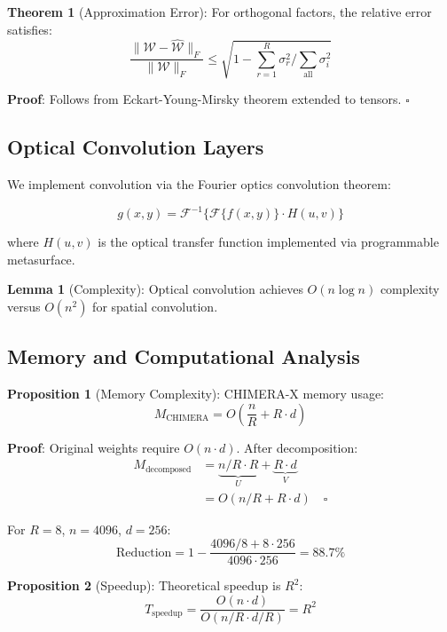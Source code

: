 \documentclass[10pt,twocolumn,letterpaper]{article}
\begin{document}
\textbf{Theorem 1} (Approximation Error): For orthogonal factors, the relative error satisfies:
\begin{equation}
\frac{\|\mathcal{W} - \hat{\mathcal{W}}\|_F}{\|\mathcal{W}\|_F} \leq 
\sqrt{1 - \sum_{r=1}^{R} \sigma_r^2 / \sum_{\text{all}} \sigma_i^2}
\end{equation}

\textbf{Proof}: Follows from Eckart-Young-Mirsky theorem extended to tensors. $\square$

\subsection{Optical Convolution Layers}

We implement convolution via the Fourier optics convolution theorem:

\begin{equation}
\label{eq:optical_conv}
g(x,y) = \mathcal{F}^{-1}\{\mathcal{F}\{f(x,y)\} \cdot H(u,v)\}
\end{equation}

where $H(u,v)$ is the optical transfer function implemented via programmable metasurface.

\textbf{Lemma 1} (Complexity): Optical convolution achieves $O(n \log n)$ complexity versus $O(n^2)$ for spatial convolution.

\subsection{Memory and Computational Analysis}

\textbf{Proposition 1} (Memory Complexity): CHIMERA-X memory usage:
\begin{equation}
\label{eq:memory}
M_{\text{CHIMERA}} = O\left(\frac{n}{R} + R \cdot d\right)
\end{equation}

\textbf{Proof}: Original weights require $O(n \cdot d)$. After decomposition:
\begin{align}
M_{\text{decomposed}} &= \underbrace{n/R \cdot R}_{U} + \underbrace{R \cdot d}_{V} \\
&= O(n/R + R \cdot d) \quad \square
\end{align}

For $R=8$, $n=4096$, $d=256$:
\begin{equation}
\text{Reduction} = 1 - \frac{4096/8 + 8 \cdot 256}{4096 \cdot 256} = 88.7\%
\end{equation}

\textbf{Proposition 2} (Speedup): Theoretical speedup is $R^2$:
\begin{equation}
\label{eq:speedup}
T_{\text{speedup}} = \frac{O(n \cdot d)}{O(n/R \cdot d/R)} = R^2
\end{equation}
\end{document}
